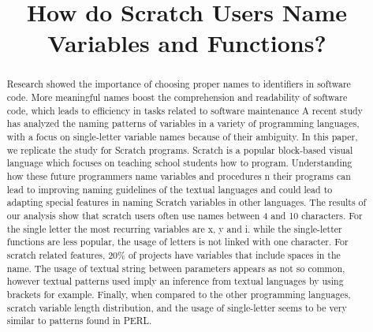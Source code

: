 \documentclass[conference]{IEEEtran}
\begin{document}
\title{How do Scratch Users Name Variables and Functions? }

\author{
\and
{}
}
\maketitle

\begin{abstract}
Research showed the importance of choosing proper names to identifiers in software code. More meaningful names boost the comprehension and readability of software code, which leads to efficiency in tasks related to software maintenance A recent study has analyzed the naming patterns of variables in a variety of programming languages, with a focus on single-letter variable names because of their ambiguity. In this paper, we replicate the study for Scratch programs. Scratch is a popular block-based visual language which focuses on teaching school students how to program. Understanding how these future programmers name variables and procedures n their programs can lead to improving naming guidelines of the textual languages and could lead to adapting special features in naming Scratch variables in other languages. The results of our analysis show that scratch users often use names between 4 and 10 characters. For the single letter the most recurring variables are x, y and i. while the single-letter functions are less popular, the usage of letters is not linked with one character. For scratch related features, 20\% of projects have variables that include spaces in the name. The usage of textual string between parameters appears as not so common, however textual patterns used imply an inference from textual languages by using brackets for example. Finally, when compared to the other programming languages, scratch variable length distribution, and the usage of single-letter seems to be very similar to patterns found in PERL.
\end{abstract}

\IEEEpeerreviewmaketitle
\end{document}
